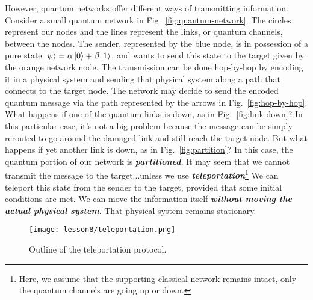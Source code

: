 However, quantum networks offer different ways of transmitting information.
Consider a small quantum network in Fig.~\ref{fig:quantum-network}.
The circles represent our nodes and the lines represent the links, or quantum channels, between the nodes.
The sender, represented by the blue node, is in possession of a pure state $\left| \psi \right\rangle = \alpha\left| 0 \right\rangle+\beta\left| 1 \right\rangle$, and  wants to send this state to the target given by the orange network node.
The transmission can be done hop-by-hop by encoding it in a physical system and sending that physical system along a path that connects to the target node.
The network may decide to send the encoded quantum message via the path represented by the arrows in Fig.~\ref{fig:hop-by-hop}.
What happens if one of the quantum links is down, as in Fig.~\ref{fig:link-down}?
In this particular case, it's not a big problem because the message can be simply rerouted to go around the damaged link and still reach the target node.
But what happens if yet another link is down, as in Fig.~\ref{fig:partition}?
In this case, the quantum portion of our network is \textbf{\emph{partitioned}}.
It may seem that we cannot transmit the message to the target...unless we use \textbf{\emph{teleportation}}\footnote{Here, we assume that the supporting classical network remains intact, only the quantum channels are going up or down.}
We can teleport this state from the sender to the target, provided that some initial conditions are met.
We can move the information itself \textbf{\emph{without moving the actual physical system}}.
That physical system remains stationary.

\begin{figure}[H]
    \centering
    \texttt{[image: lesson8/teleportation.png]}
        \caption{Outline of the teleportation protocol.}
    \label{fig:teleportation}
\end{figure}

